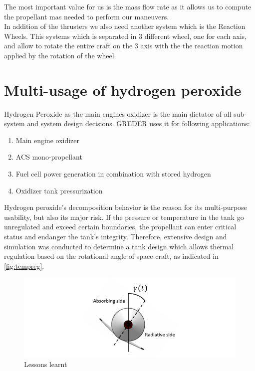 The most important value for us is the mass flow rate as it allows us to compute the propellant mas needed to perform our maneuvers. \\


In addition of the thrusters we also need another system which is the Reaction Wheels. This systems which is separated in 3 different wheel, one for each axis, and allow to rotate the entire craft on the 3 axis with the the reaction motion applied by the rotation of the wheel.

\section{Multi-usage of hydrogen peroxide}
\label{sec:10-3}
Hydrogen Peroxide as the main engines oxidizer is the main dictator of all sub-system and system design decisions. GREDER uses it for following applications:
\begin{enumerate}
	\item	Main engine oxidizer
	\item	ACS mono-propellant
	\item	Fuel cell power generation in combination with stored hydrogen
	\item	Oxidizer tank pressurization
\end{enumerate}

Hydrogen peroxide’s decomposition behavior is the reason for its multi-purpose usability, but also its major risk. If the pressure or temperature in the tank go unregulated and exceed certain boundaries, the propellant can enter critical status and endanger the tank’s integrity. Therefore, extensive design and simulation was conducted to determine a tank design which allows thermal regulation based on the rotational angle of space craft, as indicated in \autoref{fig:tempreg}. 

\begin{figure}[H]
	\centering
	\includegraphics[width=\linewidth]{tempreg}
	\caption{Lessons learnt}\label{fig:tempreg}
\end{figure}

